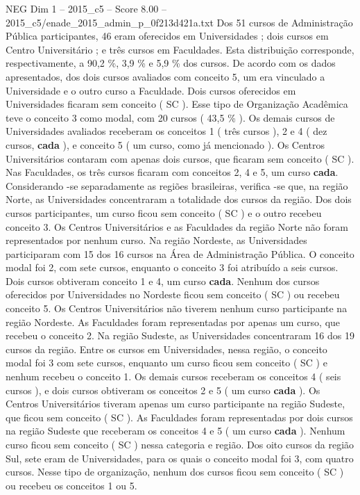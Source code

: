 \begin{textsample}{NEG Dim 1 – 2015\_c5 – Score 8.00 – 2015\_c5/enade\_2015\_admin\_p\_0f213d421a.txt}
Dos 51 cursos de Administração Pública participantes, 46 eram oferecidos em Universidades ; dois cursos em Centro Universitário ; e três cursos em Faculdades.
Esta distribuição corresponde, respectivamente, a 90,2 \%, 3,9 \% e 5,9 \% dos cursos.
De acordo com os dados apresentados, dos dois cursos avaliados com conceito 5, um era vinculado a Universidade e o outro curso a Faculdade.
Dois cursos oferecidos em Universidades ficaram sem conceito ( SC ).
Esse tipo de Organização Acadêmica teve o conceito 3 como modal, com 20 cursos ( 43,5 \% ).
Os demais cursos de Universidades avaliados receberam os conceitos 1 ( três cursos ), 2 e 4 ( dez cursos, \textbf{cada} ), e conceito 5 ( um curso, como já mencionado ).
Os Centros Universitários contaram com apenas dois cursos, que ficaram sem conceito ( SC ).
Nas Faculdades, os três cursos ficaram com conceitos 2, 4 e 5, um curso \textbf{cada}.
Considerando -se separadamente as regiões brasileiras, verifica -se que, na região Norte, as Universidades concentraram a totalidade dos cursos da região.
Dos dois cursos participantes, um curso ficou sem conceito ( SC ) e o outro recebeu conceito 3.
Os Centros Universitários e as Faculdades da região Norte não foram representados por nenhum curso.
Na região Nordeste, as Universidades participaram com 15 dos 16 cursos na Área de Administração Pública.
O conceito modal foi 2, com sete cursos, enquanto o conceito 3 foi atribuído a seis cursos.
Dois cursos obtiveram conceito 1 e 4, um curso \textbf{cada}.
Nenhum dos cursos oferecidos por Universidades no Nordeste ficou sem conceito ( SC ) ou recebeu conceito 5.
Os Centros Universitários não tiverem nenhum curso participante na região Nordeste.
As Faculdades foram representadas por apenas um curso, que recebeu o conceito 2.
Na região Sudeste, as Universidades concentraram 16 dos 19 cursos da região.
Entre os cursos em Universidades, nessa região, o conceito modal foi 3 com sete cursos, enquanto um curso ficou sem conceito ( SC ) e nenhum recebeu o conceito 1.
Os demais cursos receberam os conceitos 4 ( seis cursos ), e dois cursos obtiveram os conceitos 2 e 5 ( um curso \textbf{cada} ).
Os Centros Universitários tiveram apenas um curso participante na região Sudeste, que ficou sem conceito ( SC ).
As Faculdades foram representadas por dois cursos na região Sudeste que receberam os conceitos 4 e 5 ( um curso \textbf{cada} ).
Nenhum curso ficou sem conceito ( SC ) nessa categoria e região.
Dos oito cursos da região Sul, sete eram de Universidades, para os quais o conceito modal foi 3, com quatro cursos.
Nesse tipo de organização, nenhum dos cursos ficou sem conceito ( SC ) ou recebeu os conceitos 1 ou 5.

\end{textsample}
